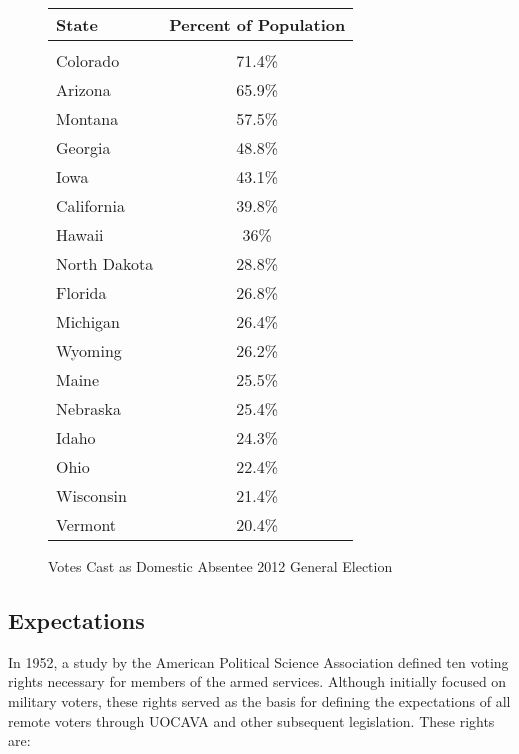 
\begin{figure}
\begin{center}
\begin{tabular}{l c}
{\bf State} & {\bf Percent of Population}\\\hline\\
Colorado & 71.4\%\\
Arizona & 65.9\%\\
Montana & 57.5\%\\
Georgia & 48.8\%\\
Iowa & 43.1\%\\
California & 39.8\%\\
Hawaii & 36\%\\
North Dakota & 28.8\%\\
Florida & 26.8\%\\
Michigan & 26.4\%\\
Wyoming & 26.2\%\\
Maine & 25.5\%\\
Nebraska & 25.4\%\\
Idaho & 24.3\%\\
Ohio & 22.4\%\\
Wisconsin & 21.4\%\\
Vermont & 20.4\%\\
\end{tabular}
\end{center}
\caption{Votes Cast as Domestic Absentee 2012 General Election}
\label{fig:domestic_populations}
\end{figure}

\subsection{Expectations}

In 1952, a study by the American Political Science Association defined
ten voting rights necessary for members of the armed
services. Although initially focused on military voters, these rights
served as the basis for defining the expectations of all remote voters
through UOCAVA and other subsequent legislation. These rights are:

